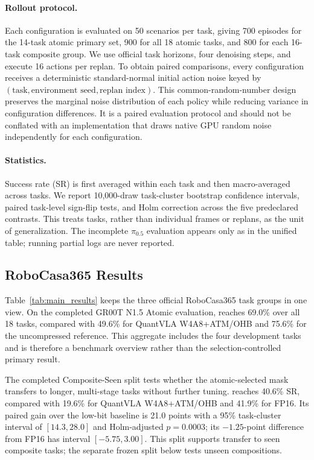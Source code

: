 \paragraph{Rollout protocol.}
Each configuration is evaluated on 50 scenarios per task, giving 700 episodes for the 14-task atomic primary set, 900 for all 18 atomic tasks, and 800 for each 16-task composite group. We use official task horizons, four denoising steps, and execute 16 actions per replan. To obtain paired comparisons, every configuration receives a deterministic standard-normal initial action noise keyed by $(\text{task},\text{environment seed},\text{replan index})$. This common-random-number design preserves the marginal noise distribution of each policy while reducing variance in configuration differences. It is a paired evaluation protocol and should not be conflated with an implementation that draws native GPU random noise independently for each configuration.

\paragraph{Statistics.}
Success rate (SR) is first averaged within each task and then macro-averaged across tasks. We report 10,000-draw task-cluster bootstrap confidence intervals, paired task-level sign-flip tests, and Holm correction across the five predeclared contrasts. This treats tasks, rather than individual frames or replans, as the unit of generalization. The incomplete $\pi_{0.5}$ evaluation appears only as \todoresult{} in the unified table; running partial logs are never reported.

\subsection{RoboCasa365 Results}
\label{sec:main_results}



Table~\ref{tab:main_results} keeps the three official RoboCasa365 task groups in one view. On the completed GR00T N1.5 Atomic evaluation, \method reaches 69.0\% over all 18 tasks, compared with 49.6\% for QuantVLA W4A8+ATM/OHB and 75.6\% for the uncompressed reference. This aggregate includes the four development tasks and is therefore a benchmark overview rather than the selection-controlled primary result.

The completed Composite-Seen split tests whether the atomic-selected mask transfers to longer, multi-stage tasks without further tuning. \method reaches 40.6\% SR, compared with 19.6\% for QuantVLA W4A8+ATM/OHB and 41.9\% for FP16. Its paired gain over the low-bit baseline is 21.0 points with a 95\% task-cluster interval of $[14.3,28.0]$ and Holm-adjusted $p=0.0003$; its $-1.25$-point difference from FP16 has interval $[-5.75,3.00]$. This split supports transfer to seen composite tasks; the separate frozen split below tests unseen compositions.

